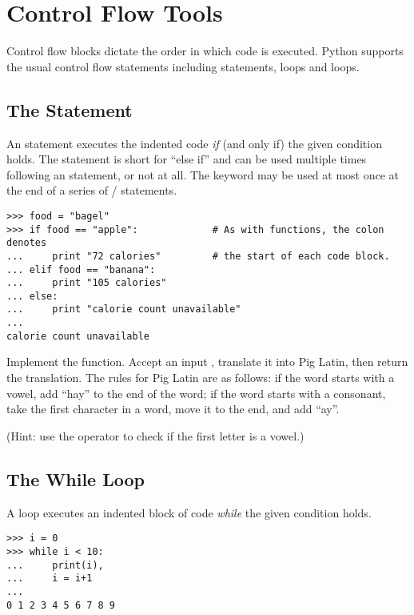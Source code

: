 
\section*{Control Flow Tools}
Control flow blocks dictate the order in which code is executed.
Python supports the usual control flow statements including  statements,  loops and  loops.

\subsection*{The  Statement}
An  statement executes the indented code \emph{if} (and only if) the given condition holds.
The  statement is short for ``else if'' and can be used multiple times following an  statement, or not at all. 
The  keyword may be used at most once at the end of a series of / statements.
\begin{lstlisting}
>>> food = "bagel"         
>>> if food == "apple":             # As with functions, the colon denotes
...     print "72 calories"         # the start of each code block.
... elif food == "banana":
...     print "105 calories"
... else: 
...     print "calorie count unavailable"
...     
calorie count unavailable
\end{lstlisting}

\begin{problem}
Implement the  function.
Accept an input , translate it into Pig Latin, then return the translation.
The rules for Pig Latin are as follows: if the word starts with a vowel, add ``hay'' to the end of the word; if the word starts with a consonant, take the first character in a word, move it to the end, and add ``ay''.

(Hint: use the  operator to check if the first letter is a vowel.)
\end{problem}

\subsection*{The While Loop}
A  loop executes an indented block of code \emph{while} the given condition holds. 

\begin{lstlisting}
>>> i = 0
>>> while i < 10:        
...     print(i),            
...     i = i+1
...     
0 1 2 3 4 5 6 7 8 9
\end{lstlisting}

